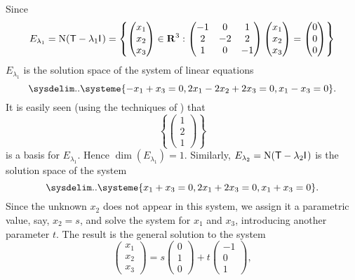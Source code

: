 \begin{example}
Since
\[
    E_{\lambda_1} = \mathrm{N}(\textsf{T} - \lambda_{1} \textsf{I}_{_{}} )
    = \left\{
        \begin{pmatrix} x_{1} \\ x_{2} \\ x_{3} \end{pmatrix}
        \in \mathbf{R}^3 : \begin{pmatrix} -1 & 0 & 1 \\ 2 & -2 & 2 \\ 1 & 0 & -1 \end{pmatrix}
        \begin{pmatrix} x_{1} \\ x_{2} \\ x_{3} \end{pmatrix}
        = \begin{pmatrix} 0 \\ 0 \\ 0 \end{pmatrix}
    \right\}
\]
\(E_{\lambda_1}\) is the solution space of the system of linear equations
\[
    \sysdelim..\systeme{
        -x_1 + x_3 = 0,
        2x_1 - 2x_2 + 2x_3 = 0,
        x_1 - x_3 = 0
    }.
\]
It is easily seen (using the techniques of ) that
\[
    \left\{ \begin{pmatrix} 1 \\ 2 \\ 1 \end{pmatrix} \right\}
\]
is a basis for \(E_{\lambda_1}\).
Hence \(\dim(E_{\lambda_1}) = 1\).
Similarly, \(E_{\lambda_2} = \mathrm{N}(\textsf{T} - \lambda_2 \textsf{I}_{_{}})\) is the solution space of the system
\[
    \sysdelim..\systeme{
        x_1 + x_3 = 0,
        2x_1 + 2x_3 = 0,
        x_1 + x_3 = 0
    }.
\]
Since the unknown \(x_2\) does not appear in this system, we assign it a parametric value, say, \(x_2 = s\), and solve the system for \(x_1\) and \(x_3\), introducing another parameter \(t\).
The result is the general solution to the system
\[
    \begin{pmatrix} x_{1} \\ x_{2} \\ x_{3} \end{pmatrix}
    = s\begin{pmatrix} 0 \\ 1 \\ 0 \end{pmatrix}
    + t \begin{pmatrix} -1 \\ 0 \\ 1 \end{pmatrix},
\]
\end{example}
